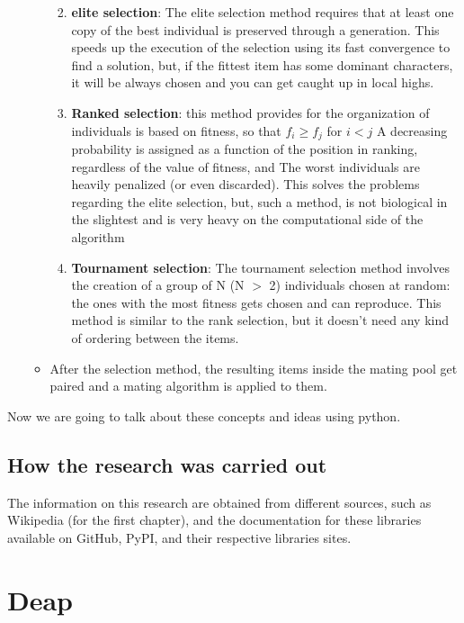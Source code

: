 \documentclass{article}
\begin{document}
\begin{enumerate}
\begin{itemize}
\begin{enumerate}
\begin{itemize}
                    \end{itemize}
                    \item \textbf{elite selection}: The elite selection method requires that at least one copy of the best individual is preserved through a generation. This speeds up the execution of the selection using its fast convergence to find a solution, but, if the fittest item has some dominant characters, it will be always chosen and you can get caught up in local highs. 
                    \item \textbf{Ranked selection}: this method provides for the organization of individuals is based on fitness, so that $ f_i \geq f_j $ for $i<j$
                    \subitem A decreasing probability is assigned as a function of the position in ranking, regardless of the value of fitness, and The worst individuals are heavily penalized (or even discarded). This solves the problems regarding the elite selection, but, such a method, is not biological in the slightest and is very heavy on the computational side of the algorithm
                    \item \textbf{Tournament selection}: The tournament selection method involves the creation of a group of N (N $>$ 2) individuals chosen at random: the ones with the most fitness gets chosen and can reproduce. This method is similar to the rank selection, but it doesn't need any kind of ordering between the items.
                    \end{enumerate}
                \item After the selection method, the resulting items inside the mating pool get paired and a mating algorithm is applied to them.            
        \end{itemize}
\end{enumerate}

Now we are going to talk about these concepts and ideas using python.




\subsection{How the research was carried out}
        The information on this research are obtained from different sources, such as Wikipedia (for the first chapter), and the documentation for these libraries available on GitHub, PyPI, and their respective libraries sites. 

\section{Deap}
\end{document}
